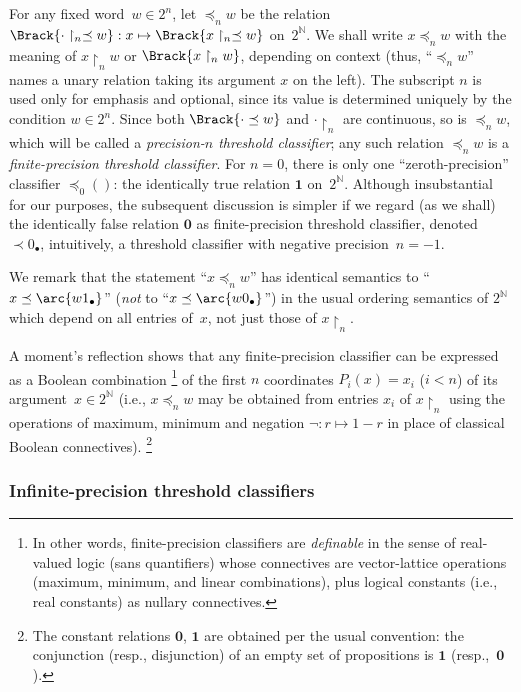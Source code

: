For any fixed word~$w\in2^n$, let ${\preccurlyeq}_nw$ be the relation $\Brack{\cdot\restriction_n \preceq w}: x\mapsto \Brack{x\restriction_n\preceq w}$ on~$2^{\mathbb{N}}$.
We shall write $x{\preccurlyeq}_nw$ with the meaning of $x\restriction_nw$ or $\Brack{x\restriction_nw}$, depending on context
(thus, “${\preccurlyeq}_nw$” names a unary relation taking its argument $x$ on the left).
The subscript $n$ is used only for emphasis and optional, since its value is determined uniquely by the condition $w\in 2^n$.
Since both $\Brack{\cdot\preceq w}$ and $\cdot\restriction_n$ are continuous, so is ${\preccurlyeq}_nw$, which will be called a \emph{precision-$n$ threshold classifier};
any such relation ${\preccurlyeq}_nw$ is a \emph{finite-precision threshold classifier}.
For $n=0$, there is only one “zeroth-precision” classifier ${\preccurlyeq}_0{()}$:
the identically true relation $\mathbf{1}$ on~$2^{\mathbb{N}}$.
Although insubstantial for our purposes, the subsequent discussion is simpler if we regard (as we shall) the identically false relation $\mathbf{0}$ as finite-precision threshold classifier, denoted ${\prec}0_{\bullet}$, intuitively, a threshold classifier with negative precision~$n = -1$.

We remark that the statement “$x\preccurlyeq_nw$” has identical semantics to “$x\preceq \arc{w1_{\bullet}}$” (\emph{not} to “$x\preceq \arc{w0_{\bullet}}$”) in the usual ordering semantics of $2^{\mathbb{N}}$ which depend on all entries of~$x$, not just those of $x{\restriction}_n$.

A moment's reflection shows that any finite-precision classifier can be expressed as a Boolean combination \footnote{In other words, finite-precision classifiers are \emph{definable} in the sense of real-valued logic (sans quantifiers) whose connectives are vector-lattice operations (maximum, minimum, and linear combinations), plus logical constants (i.e., real constants) as nullary connectives.} of the first $n$ coordinates $P_i(x)=x_i$ ($i<n$) of its argument~$x\in 2^{\mathbb{N}}$
(i.e., $x{\preccurlyeq}_nw$ may be obtained from entries $x_i$ of $x\restriction_n$ using the operations of maximum, minimum and negation $\neg: r\mapsto 1-r$ in place of classical Boolean connectives). \footnote{The constant relations $\mathbf{0}$, $\mathbf{1}$ are obtained per the usual convention: the conjunction (resp., disjunction) of an empty set of propositions is $\mathbf{1}$ (resp.,~$\mathbf{0}$).}

\subsubsection{Infinite-precision threshold classifiers}
\label{sec:infin-prec-class}

